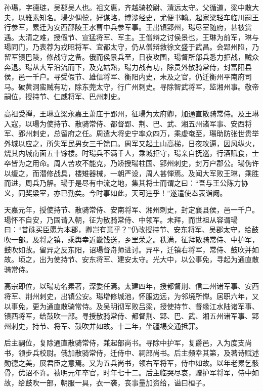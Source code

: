 \documentclass[]{article}
\begin{document}
孙瑒，字德琏，吴郡吴人也。祖文惠，齐越骑校尉、清远太守。父循道，梁中散大夫，以雅素知名。瑒少倜傥，好谋略，博涉经史，尤便书翰。起家梁轻车临川嗣王行参军，累迁为安西邵陵王水曹中兵参军事。王出镇郢州，瑒尽室随府，甚被赏遇。太清之难，授假节、宣猛将军、军主。王僧辩之讨侯景也，王琳为前军，琳与瑒同门，乃表荐为戎昭将军、宜都太守，仍从僧辩救徐文盛于武昌。会郢州陷，乃留军镇巴陵，修战守之备。俄而侯景兵至，日夜攻围，瑒督所部兵悉力拒战，贼众奔退。瑒从大军沿流而下，及克姑熟，瑒力战有功，除员外散骑常侍，封富阳县侯，邑一千户。寻受假节、雄信将军、衡阳内史，未及之官，仍迁衡州平南府司马。破黄洞蛮贼有功，除东莞太守，行广州刺史。寻除智武将军，监湘州事。敬帝嗣位，授持节、仁威将军、巴州刺史。

高祖受禅，王琳立梁永嘉王萧庄于郢州，征瑒为太府卿，加通直散骑常侍。及王琳入寇，以瑒为使持节、散骑常侍、都督郢、荆、巴、武、湘五州诸军事、安西将军、郢州刺史，总留府之任。周遣大将史宁率众四万，乘虚奄至，瑒助防张世贵举外城以应之，所失军民男女三千馀口。周军又起土山高梯，日夜攻逼，因风纵火，烧其内城南面五十馀楼。时瑒兵不满千人，乘城拒守，瑒亲自抚巡，行酒赋食，士卒皆为之用命。周人苦攻不能克，乃矫授瑒柱国、郢州刺史，封万户郡公。瑒伪许以缓之，而潜修战具，楼雉器械，一朝严设，周人甚惮焉。及闻大军败王琳，乘胜而进，周兵乃解。瑒于是尽有中流之地，集其将士而谓之曰：``吾与王公陈力协义，同奖梁室，亦已勤矣。今时事如此，天可违乎！''遂遣使奉表诣阙。

天嘉元年，授使持节、散骑常侍、安南将军、湘州刺史，封定襄县侯，邑一千户。瑒怀不自安，乃固请入朝，征为散骑常侍、中领军。未拜，而世祖从容谓瑒曰：``昔硃买臣愿为本郡，卿岂有意乎？''仍改授持节、安东将军、吴郡太守，给鼓吹一部。及将之镇，乘舆幸近畿饯送，乡里荣之。秩满，征拜散骑常侍、中护军，鼓吹如故。留异之反东阳，诏瑒督舟师进讨。异平，迁镇右将军，常侍、鼓吹并如故。顷之，出为使持节、安东将军、建安太守。光大中，以公事免，寻起为通直散骑常侍。

高宗即位，以瑒功名素著，深委任焉。太建四年，授都督荆、信二州诸军事、安西将军、荆州刺史，出镇公安。瑒增修城池，怀服边远，为邻境所惮。居职六年，又以事免，更为通直散骑常侍。及吴明彻军败吕梁，授使持节、督缘江水陆诸军事、镇西将军，给鼓吹一部。寻授散骑常侍、都督荆、郢、巴、武、湘五州诸军事、郢州刺史，持节、将军、鼓吹并如故。十二年，坐疆埸交通抵罪。

后主嗣位，复除通直散骑常侍，兼起部尚书。寻除中护军，复爵邑，入为度支尚书，领步兵校尉。俄加散骑常侍，迁侍中、祠部尚书。后主频幸其第，及著诗赋述勋德之美，展君臣之意焉。又为五兵尚书，领右军将军，侍中如故。以年老累乞骸骨，优诏不许。祯明元年卒官，时年七十二。后主临哭尽哀，赠护军将军，侍中如故，给鼓吹一部，朝服一具，衣一袭，丧事量加资给，谥曰桓子。
\end{document}
